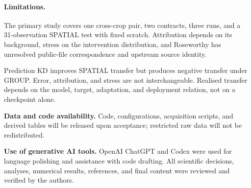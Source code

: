 \documentclass[runningheads]{venue/lncs/llncs}
\begin{document}
\paragraph{Limitations.} The primary study covers one cross-crop pair, two contracts, three runs, and a 31-observation SPATIAL test with fixed scratch. Attribution depends on its background, stress on the intervention distribution, and Roseworthy has unresolved public-file correspondence and upstream source identity.

Prediction KD improves SPATIAL transfer but produces negative transfer under GROUP. Error, attribution, and stress are not interchangeable. Realised transfer depends on the model, target, adaptation, and deployment relation, not on a checkpoint alone.

\noindent\textbf{Data and code availability.} Code, configurations, acquisition scripts, and derived tables will be released upon acceptance; restricted raw data will not be redistributed.

\noindent\textbf{Use of generative AI tools.} OpenAI ChatGPT and Codex were used for language polishing and assistance with code drafting. All scientific decisions, analyses, numerical results, references, and final content were reviewed and verified by the authors.



\end{document}
